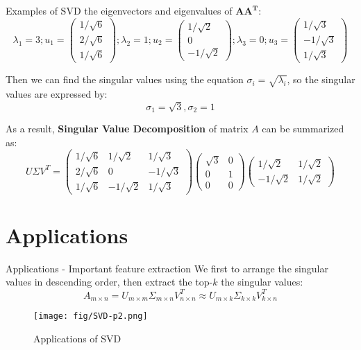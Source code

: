 \documentclass[10pt]{beamer}
\begin{document}
\begin{frame}[fragile]{Examples of SVD}
  the eigenvectors and eigenvalues of $\mathbf{AA^T}$:
  $$\lambda_1= 3; u_1 = \left( \begin{array}{ccc} 1/\sqrt{6} \\ 2/\sqrt{6} \\ 1/\sqrt{6} \end{array} \right); \lambda_2= 1; u_2 = \left( \begin{array}{ccc} 1/\sqrt{2} \\ 0 \\ -1/\sqrt{2} \end{array} \right);  \lambda_3= 0; u_3 = \left( \begin{array}{ccc} 1/\sqrt{3} \\ -1/\sqrt{3} \\ 1/\sqrt{3} \end{array} \right)$$
  
  Then we can find the singular values using the equation $\sigma_i = \sqrt{\lambda_i}$, so the singular values are expressed by: $$\sigma_1 = \sqrt{3}, \sigma_2=1$$

  As a result, \textbf{Singular Value Decomposition} of matrix $A$ can be summarized as:
  $$U\Sigma V^T = \left( \begin{array}{ccc} 1/\sqrt{6} & 1/\sqrt{2} & 1/\sqrt{3} \\ 2/\sqrt{6} & 0 & -1/\sqrt{3}\\ 1/\sqrt{6} & -1/\sqrt{2} & 1/\sqrt{3} \end{array} \right) \left( \begin{array}{ccc} \sqrt{3} & 0 \\  0 & 1\\ 0 & 0 \end{array} \right) \left( \begin{array}{ccc} 1/\sqrt{2}  & 1/\sqrt{2}  \\ -1/\sqrt{2}  & 1/\sqrt{2}  \end{array} \right)$$
\end{frame}

\section{Applications}

\begin{frame}{Applications - Important feature extraction}
  We first to arrange the singular values in descending order, then extract the top-$k$ the singular values:
  $$A_{m \times n} = U_{m \times m}\Sigma_{m \times n} V^T_{n \times n} \approx U_{m \times k}\Sigma_{k \times k} V^T_{k \times n}$$
  \begin{figure}[htbp]
    \centering
    \texttt{[image: fig/SVD-p2.png]}
    \caption{Applications of SVD}
  \end{figure}
\end{frame}
\end{document}
